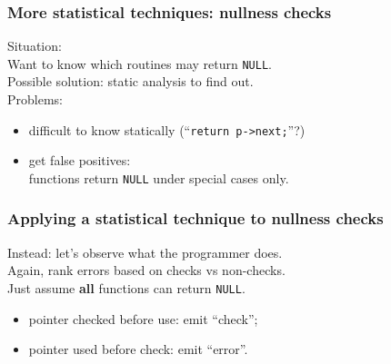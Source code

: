 \documentclass{beamer}
\newenvironment{changemargin}[1]{%
  \begin{list}{}{%
    \setlength{\topsep}{0pt}%
    \setlength{\leftmargin}{#1}%
    \setlength{\rightmargin}{1em}
    \setlength{\listparindent}{\parindent}%
    \setlength{\itemindent}{\parindent}%
    \setlength{\parsep}{\parskip}%
  }%
  \item[]}{\end{list}}
\begin{document}
\begin{frame}
\frametitle{More statistical techniques: nullness checks}
  \begin{changemargin}{2cm}
    Situation: \\[1em]
    \hspace*{1em} Want to know which routines may return {\tt NULL}.\\[1em]
    Possible solution: static analysis to find out.\\[1em]
    Problems:
    \begin{itemize}
      \item difficult to know statically (``{\tt return p->next;}''?)
      \item get false positives: \\ functions return {\tt NULL} under special cases only.
    \end{itemize}
    

  \end{changemargin}
\end{frame}

\begin{frame}
\frametitle{Applying a statistical technique to nullness checks}
  \begin{changemargin}{2cm}
    Instead: let's observe what the programmer does.\\
    Again, rank errors based on checks vs non-checks.\\[2em]
    Just assume {\bf all} functions can return {\tt NULL}.
\begin{itemize}
  \item pointer checked before use: emit ``check'';
  \item pointer used before check: emit ``error''.
\end{itemize}
  \end{changemargin}
\end{frame}
\end{document}
